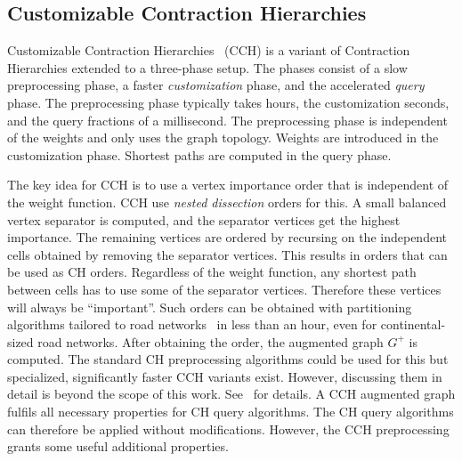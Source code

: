 \documentclass[manuscript,review]{acmart}
\begin{document}
\subsection{Customizable Contraction Hierarchies}
\label{sec:cch-intro}

Customizable Contraction Hierarchies~\cite{dsw-cch-15} (CCH) is a variant of Contraction Hierarchies extended to a three-phase setup.
The phases consist of a slow preprocessing phase, a faster \emph{customization} phase, and the accelerated \emph{query} phase.
The preprocessing phase typically takes hours, the customization seconds, and the query fractions of a millisecond.
The preprocessing phase is independent of the weights and only uses the graph topology.
Weights are introduced in the customization phase.
Shortest paths are computed in the query phase.

The key idea for CCH is to use a vertex importance order that is independent of the weight function.
CCH use \emph{nested dissection} orders for this.
A small balanced vertex separator is computed, and the separator vertices get the highest importance.
The remaining vertices are ordered by recursing on the independent cells obtained by removing the separator vertices.
This results in orders that can be used as CH orders.
Regardless of the weight function, any shortest path between cells has to use some of the separator vertices.
Therefore these vertices will always be ``important''.
Such orders can be obtained with partitioning algorithms tailored to road networks~\cite{GottesburenHUW19,hs-gbpo-18} in less than an hour, even for continental-sized road networks.
After obtaining the order, the augmented graph $G^+$ is computed.
The standard CH preprocessing algorithms could be used for this but specialized, significantly faster CCH variants exist.
However, discussing them in detail is beyond the scope of this work.
See~\cite{dsw-cch-15,DBLP:journals/jea/Buchhold0W19} for details.
A CCH augmented graph fulfils all necessary properties for CH query algorithms.
The CH query algorithms can therefore be applied without modifications.
However, the CCH preprocessing grants some useful additional properties.
\end{document}
